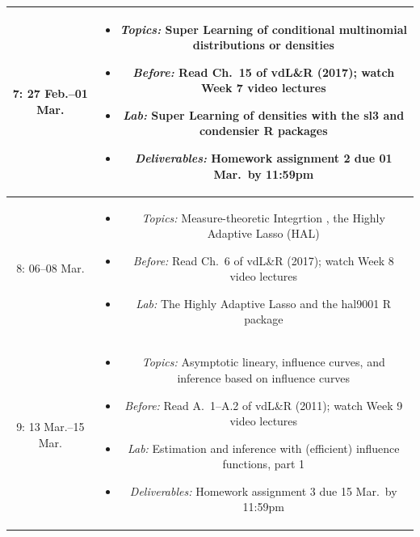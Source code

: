 \documentclass[11pt]{article}
\begin{document}
\begin{table}[H]
\begin{tabular}{ | c | c | }
7: 27 Feb.--01 Mar. & \begin{minipage}{.85\textwidth}
\begin{itemize} \itemsep-0.4em
  \vspace{1mm}
  \item \textit{Topics:} Super Learning of conditional multinomial distributions
    or densities
  \item \textit{Before:} Read Ch.~15 of vdL\&R (2017); watch Week 7 video
    lectures
  \item \textit{Lab:} Super Learning of densities with the {\rm sl3} and
    {\rm condensier} R packages
  \item \textit{Deliverables:} Homework assignment 2 due 01 Mar.~by 11:59pm
  \vspace{1mm}
\end{itemize}
\end{minipage} \\
\hline

8: 06--08 Mar. & \begin{minipage}{.85\textwidth}
\begin{itemize} \itemsep-0.4em
  \vspace{1mm}
  \item \textit{Topics:} Measure-theoretic Integrtion , the Highly Adaptive
    Lasso (HAL)
  \item \textit{Before:} Read Ch.~6 of vdL\&R (2017); watch Week 8 video
    lectures
  \item \textit{Lab:} The Highly Adaptive Lasso and the {\rm hal9001} R package
  \vspace{1mm}
\end{itemize}
\end{minipage} \\
\hline

9: 13 Mar.--15 Mar. & \begin{minipage}{.85\textwidth}
\begin{itemize} \itemsep-0.4em
  \vspace{1mm}
  \item \textit{Topics:} Asymptotic lineary, influence curves, and inference
    based on influence curves
  \item \textit{Before:} Read A.~1--A.2 of vdL\&R (2011); watch Week 9 video
    lectures
  \item \textit{Lab:} Estimation and inference with (efficient) influence
    functions, part 1
  \item \textit{Deliverables:} Homework assignment 3 due 15 Mar.~by 11:59pm
  \vspace{1mm}
\end{itemize}
\end{minipage} \\
\hline

\end{tabular} 
\end{table}
\end{document}
